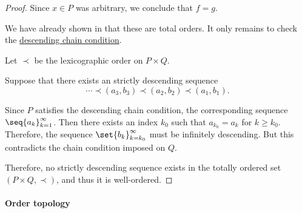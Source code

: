 \begin{proof}
  Since \( x \in P \) was arbitrary, we conclude that \( f = g \).

   We have already shown in  that these are total orders. It only remains to check the \hyperref[def:chain_condition]{descending chain condition}.

  Let \( \prec \) be the lexicographic order on \( P \times Q \).

  Suppose that there exists an strictly descending sequence
  \begin{equation*}
    \cdots \prec (a_3, b_3) \prec (a_2, b_2) \prec (a_1, b_1).
  \end{equation*}

  Since \( P \) satisfies the descending chain condition, the corresponding sequence \( \seq{ a_k }_{k=1}^\infty \). Then there exists an index \( k_0 \) such that \( a_{k_0} = a_k \) for \( k \geq k_0 \). Therefore, the sequence \( \set{ b_k }_{k=k_0}^\infty \) must be infinitely descending. But this contradicts the chain condition imposed on \( Q \).

  Therefore, no strictly descending sequence exists in the totally ordered set \( (P \times Q, \prec) \), and thus it is well-ordered.
\end{proof}

\paragraph{Order topology}

